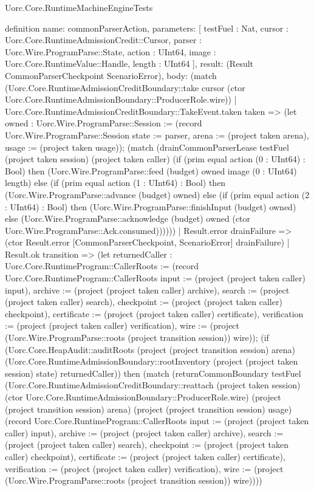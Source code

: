 \begin{lexlean}{Uorc.Core.RuntimeMachineEngineTests}
\begin{semanticmodule}
definition{
  name: commonParserAction,
  parameters: [
    testFuel : Nat,
    cursor : Uorc.Core.RuntimeAdmissionCredit::Cursor,
    parser : Uorc.Wire.ProgramParse::State,
    action : UInt64,
    image : Uorc.Core.RuntimeValue::Handle,
    length : UInt64
  ],
  result: (Result CommonParserCheckpoint ScenarioError),
  body: (match (Uorc.Core.RuntimeAdmissionCreditBoundary::take cursor (ctor Uorc.Core.RuntimeAdmissionBoundary::ProducerRole.wire))
    | Uorc.Core.RuntimeAdmissionCreditBoundary::TakeEvent.taken taken => (let owned : Uorc.Wire.ProgramParse::Session := (record Uorc.Wire.ProgramParse::Session {state := parser, arena := (project taken arena), usage := (project taken usage)}); (match (drainCommonParserLease testFuel (project taken session) (project taken caller) (if (prim equal action (0 : UInt64) : Bool) then (Uorc.Wire.ProgramParse::feed (budget) owned image (0 : UInt64) length) else (if (prim equal action (1 : UInt64) : Bool) then (Uorc.Wire.ProgramParse::advance (budget) owned) else (if (prim equal action (2 : UInt64) : Bool) then (Uorc.Wire.ProgramParse::finishInput (budget) owned) else (Uorc.Wire.ProgramParse::acknowledge (budget) owned (ctor Uorc.Wire.ProgramParse::Ack.consumed))))))
      | Result.error drainFailure => (ctor Result.error [CommonParserCheckpoint, ScenarioError] drainFailure)
      | Result.ok transition => (let returnedCaller : Uorc.Core.RuntimeProgram::CallerRoots := (record Uorc.Core.RuntimeProgram::CallerRoots {input := (project (project taken caller) input), archive := (project (project taken caller) archive), search := (project (project taken caller) search), checkpoint := (project (project taken caller) checkpoint), certificate := (project (project taken caller) certificate), verification := (project (project taken caller) verification), wire := (project (Uorc.Wire.ProgramParse::roots (project transition session)) wire)}); (if (Uorc.Core.HeapAudit::auditRoots (project (project transition session) arena) (Uorc.Core.RuntimeAdmissionBoundary::rootInventory (project (project taken session) state) returnedCaller)) then (match (returnCommonBoundary testFuel (Uorc.Core.RuntimeAdmissionCreditBoundary::reattach (project taken session) (ctor Uorc.Core.RuntimeAdmissionBoundary::ProducerRole.wire) (project (project transition session) arena) (project (project transition session) usage) (record Uorc.Core.RuntimeProgram::CallerRoots {input := (project (project taken caller) input), archive := (project (project taken caller) archive), search := (project (project taken caller) search), checkpoint := (project (project taken caller) checkpoint), certificate := (project (project taken caller) certificate), verification := (project (project taken caller) verification), wire := (project (Uorc.Wire.ProgramParse::roots (project transition session)) wire)})))
}
\end{semanticmodule}
\end{lexlean}
